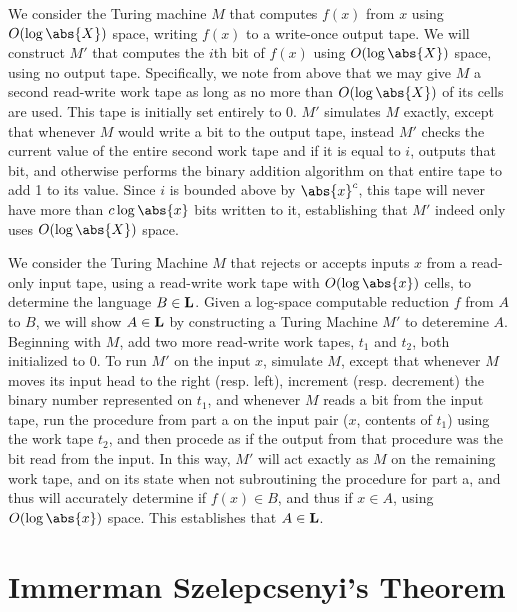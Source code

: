 \documentclass{article}
\begin{document}
\begin{alphalist}
\item We consider the Turing machine $M$ that computes $f(x)$ from $x$ using $O(\log\abs{X})$ space, writing $f(x)$ to a write-once output tape. We will construct $M'$ that computes the $i$th bit of $f(x)$ using $O(\log\abs{X})$ space, using no output tape. Specifically, we note from above that we may give $M$ a second read-write work tape as long as no more than $O(\log\abs{X})$ of its cells are used. This tape is initially set entirely to 0. $M'$ simulates $M$ exactly, except that whenever $M$ would write a bit to the output tape, instead $M'$ checks the current value of the entire second work tape and if it is equal to $i$, outputs that bit, and otherwise performs the binary addition algorithm on that entire tape to add 1 to its value. Since $i$ is bounded above by $ \abs{x}^c$, this tape will never have more than $c\log\abs{x}$ bits written to it, establishing that $M'$ indeed only uses $O(\log\abs{X})$ space.
\item We consider the Turing Machine $M$ that rejects or accepts inputs $x$ from a read-only input tape, using a read-write work tape with $O(\log\abs{x})$ cells, to determine the language $B \in \mathbf{L}$. Given a log-space computable reduction $f$ from $A$ to $B$, we will show $A \in \mathbf{L}$ by constructing a Turing Machine $M'$ to deteremine $A$. Beginning with $M$, add two more read-write work tapes, $t_1$ and $t_2$, both initialized to 0. To run $M'$ on the input $x$, simulate $M$, except that whenever $M$ moves its input head to the right (resp. left), increment (resp. decrement) the binary number represented on $t_1$, and whenever $M$ reads a bit from the input tape, run the procedure from part a on the input pair ($x$, contents of $t_1$) using the work tape $t_2$, and then procede as if the output from that procedure was the bit read from the input. In this way, $M'$ will act exactly as $M$ on the remaining work tape, and on its state when not subroutining the procedure for part a, and thus will accurately determine if $f(x) \in B$, and thus if $x \in A$, using $O(\log\abs{x})$ space. This establishes that $A \in \mathbf{L}$.
\end{alphalist}

\section{Immerman Szelepcsenyi's Theorem}
\end{document}
